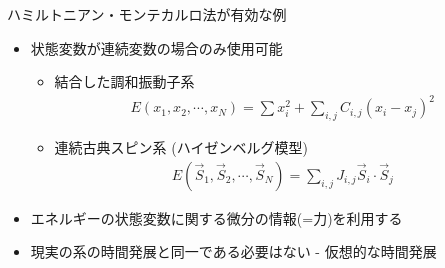 
\begin{frame}[t,fragile]{ハミルトニアン・モンテカルロ法が有効な例}
  \begin{itemize}
  \item 状態変数が連続変数の場合のみ使用可能
  \begin{itemize}
    \item 結合した調和振動子系
      \begin{align*}
        E(x_1,x_2,\cdots,x_N) = \sum x_i^2 + \sum_{i,j} C_{i,j} (x_i - x_j)^2
      \end{align*}
    \item 連続古典スピン系 (ハイゼンベルグ模型)
      \begin{align*}
        E(\vec{S}_1, \vec{S}_2, \cdots, \vec{S}_N) = \sum_{i,j} J_{i,j} \vec{S}_i \cdot \vec{S}_j
      \end{align*}
  \end{itemize}

  \item エネルギーの状態変数に関する微分の情報(=力)を利用する
  \item 現実の系の時間発展と同一である必要はない - 仮想的な時間発展
\end{itemize}
\end{frame}
